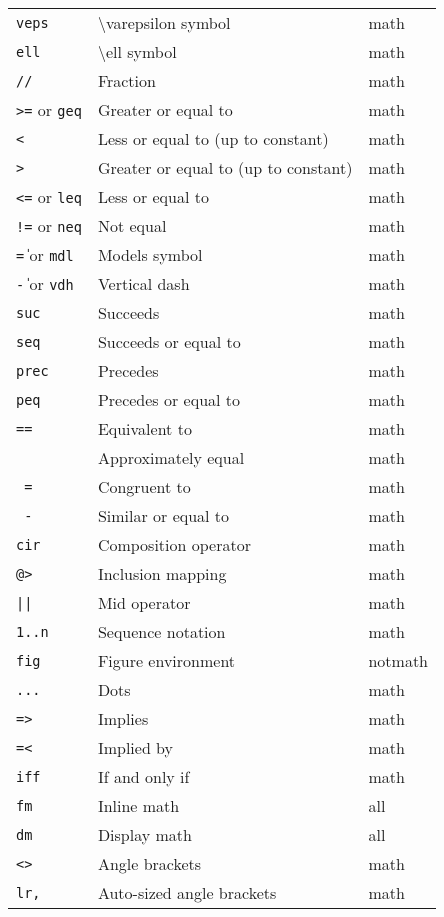 \documentclass{article}
\begin{document}
\begin{longtable}{|p{}|p{}|p{}|}
\texttt{veps} & \textbackslash varepsilon symbol & math \\
\texttt{ell} & \textbackslash ell symbol & math \\
\texttt{//} & Fraction & math \\
\texttt{>=} or \texttt{geq} & Greater or equal to & math \\
\texttt{<~} & Less or equal to (up to constant) & math \\
\texttt{>~} & Greater or equal to (up to constant) & math \\
\texttt{<=} or \texttt{leq} & Less or equal to & math \\
\texttt{!=} or \texttt{neq} & Not equal & math \\
\texttt{\|=} or \texttt{mdl} & Models symbol & math \\
\texttt{\|-} or \texttt{vdh} & Vertical dash & math \\
\texttt{suc} & Succeeds & math \\
\texttt{seq} & Succeeds or equal to & math \\
\texttt{prec} & Precedes & math \\
\texttt{peq} & Precedes or equal to & math \\
\texttt{==} & Equivalent to & math \\
\texttt{~~} & Approximately equal & math \\
\texttt{~=} & Congruent to & math \\
\texttt{~-} & Similar or equal to & math \\
\texttt{cir} & Composition operator & math \\
\texttt{@>} & Inclusion mapping & math \\
\texttt{||} & Mid operator & math \\
\texttt{1..n} & Sequence notation & math \\
\texttt{fig} & Figure environment & notmath \\
\texttt{...} & Dots & math \\
\texttt{=>} & Implies & math \\
\texttt{=<} & Implied by & math \\
\texttt{iff} & If and only if & math \\
\texttt{fm} & Inline math & all \\
\texttt{dm} & Display math & all \\
\texttt{<>} & Angle brackets & math \\
\texttt{lr,} & Auto-sized angle brackets & math \\

\end{longtable}
\end{document}
